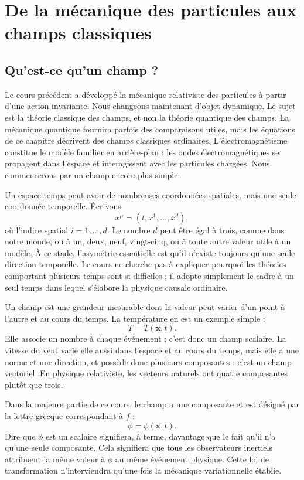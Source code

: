 \chapter{De la mécanique des particules aux champs classiques}

\section{Qu’est-ce qu’un champ ?}

Le cours précédent a développé la mécanique relativiste des particules à partir d’une action invariante. Nous changeons maintenant d’objet dynamique. Le sujet est la théorie classique des champs, et non la théorie quantique des champs. La mécanique quantique fournira parfois des comparaisons utiles, mais les équations de ce chapitre décrivent des champs classiques ordinaires. L’électromagnétisme constitue le modèle familier en arrière-plan : les ondes électromagnétiques se propagent dans l’espace et interagissent avec les particules chargées. Nous commencerons par un champ encore plus simple.

Un espace-temps peut avoir de nombreuses coordonnées spatiales, mais une seule coordonnée temporelle. Écrivons
\begin{equation}
x^\mu=(t,x^1,\ldots,x^d),
\end{equation}
où l’indice spatial \(i=1,\ldots,d\). Le nombre \(d\) peut être égal à trois, comme dans notre monde, ou à un, deux, neuf, vingt-cinq, ou à toute autre valeur utile à un modèle. À ce stade, l’asymétrie essentielle est qu’il n’existe toujours qu’une seule direction temporelle. Le cours ne cherche pas à expliquer pourquoi les théories comportant plusieurs temps sont si difficiles ; il adopte simplement le cadre à un seul temps dans lequel s’élabore la physique causale ordinaire.

Un champ est une grandeur mesurable dont la valeur peut varier d’un point à l’autre et au cours du temps. La température en est un exemple simple :
\begin{equation}
T=T(\mathbf{x},t).
\end{equation}
Elle associe un nombre à chaque événement ; c’est donc un champ scalaire. La vitesse du vent varie elle aussi dans l’espace et au cours du temps, mais elle a une norme et une direction, et possède donc plusieurs composantes : c’est un champ vectoriel. En physique relativiste, les vecteurs naturels ont quatre composantes plutôt que trois.

Dans la majeure partie de ce cours, le champ a une composante et est désigné par la lettre grecque correspondant à \(f\) :
\begin{equation}
\phi=\phi(\mathbf{x},t).
\label{eq:sr4-field-definition}
\end{equation}
Dire que \(\phi\) est un scalaire signifiera, à terme, davantage que le fait qu’il n’a qu’une seule composante. Cela signifiera que tous les observateurs inertiels attribuent la même valeur à \(\phi\) au même événement physique. Cette loi de transformation n’interviendra qu’une fois la mécanique variationnelle établie.

